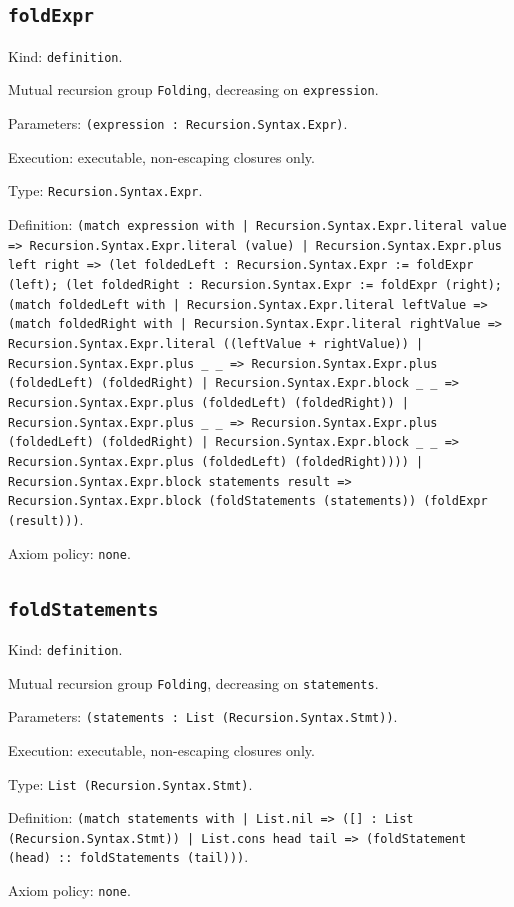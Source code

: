 \documentclass[11pt]{article}
\begin{document}
\subsection*{\texttt{foldExpr}}
\noindent Kind: \texttt{definition}.\par
\noindent Mutual recursion group \texttt{Folding}, decreasing on \texttt{expression}.\par
\noindent Parameters: \texttt{(expression : Recursion.Syntax.Expr)}.\par
\noindent Execution: executable, non-escaping closures only.\par
\noindent Type: \texttt{Recursion.Syntax.Expr}.\par
\noindent Definition: \texttt{(match expression with | Recursion.Syntax.Expr.literal value => Recursion.Syntax.Expr.literal (value) | Recursion.Syntax.Expr.plus left right => (let foldedLeft : Recursion.Syntax.Expr := foldExpr (left); (let foldedRight : Recursion.Syntax.Expr := foldExpr (right); (match foldedLeft with | Recursion.Syntax.Expr.literal leftValue => (match foldedRight with | Recursion.Syntax.Expr.literal rightValue => Recursion.Syntax.Expr.literal ((leftValue + rightValue)) | Recursion.Syntax.Expr.plus \_ \_ => Recursion.Syntax.Expr.plus (foldedLeft) (foldedRight) | Recursion.Syntax.Expr.block \_ \_ => Recursion.Syntax.Expr.plus (foldedLeft) (foldedRight)) | Recursion.Syntax.Expr.plus \_ \_ => Recursion.Syntax.Expr.plus (foldedLeft) (foldedRight) | Recursion.Syntax.Expr.block \_ \_ => Recursion.Syntax.Expr.plus (foldedLeft) (foldedRight)))) | Recursion.Syntax.Expr.block statements result => Recursion.Syntax.Expr.block (foldStatements (statements)) (foldExpr (result)))}.\par
\noindent Axiom policy: \texttt{none}.\par
\subsection*{\texttt{foldStatements}}
\noindent Kind: \texttt{definition}.\par
\noindent Mutual recursion group \texttt{Folding}, decreasing on \texttt{statements}.\par
\noindent Parameters: \texttt{(statements : List (Recursion.Syntax.Stmt))}.\par
\noindent Execution: executable, non-escaping closures only.\par
\noindent Type: \texttt{List (Recursion.Syntax.Stmt)}.\par
\noindent Definition: \texttt{(match statements with | List.nil => ([] : List (Recursion.Syntax.Stmt)) | List.cons head tail => (foldStatement (head) :: foldStatements (tail)))}.\par
\noindent Axiom policy: \texttt{none}.\par
\end{document}
